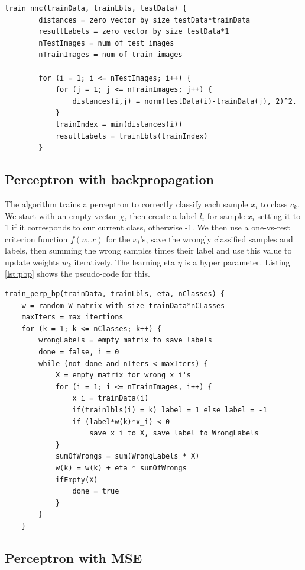 \documentclass[journal]{IEEEtran}
\begin{document}
\begin{minipage}[H]{0.95\linewidth}
	\begin{lstlisting}[caption=Implementation of NNC., label={lst:nnc}]
	train_nnc(trainData, trainLbls, testData) {
		distances = zero vector by size testData*trainData
		resultLabels = zero vector by size testData*1
		nTestImages = num of test images
		nTrainImages = num of train images
		
		for (i = 1; i <= nTestImages; i++) {
			for (j = 1; j <= nTrainImages; j++) {
				distances(i,j) = norm(testData(i)-trainData(j), 2)^2.
			}			
			trainIndex = min(distances(i))
			resultLabels = trainLbls(trainIndex)
		}
	\end{lstlisting}
\end{minipage}

\subsection{Perceptron with backpropagation} 

The algorithm trains a perceptron to correctly classify each sample $x_{i}$ to class $c_{k}$. We start with an empty vector $\chi$, then create a label $l_{i}$ for sample $x_{i}$ setting it to 1 if it corresponds to our current class, otherwise -1. We then use a one-vs-rest criterion function $f(w,x)$ for the $x_{i}$'s, save the wrongly classified samples and labels, then summing the wrong samples times their label and use this value to update weights $w_{k}$ iteratively. The learning eta $\eta$ is a hyper parameter. Listing \ref{lst:pbp} shows the pseudo-code for this.

\begin{lstlisting}[caption=Implementation of a perceptron with backprogapation., label={lst:pbp}]
	train_perp_bp(trainData, trainLbls, eta, nClasses) {
	w = random W matrix with size trainData*nCLasses
	maxIters = max itertions
	for (k = 1; k <= nClasses; k++) {
		wrongLabels = empty matrix to save labels
		done = false, i = 0
		while (not done and nIters < maxIters) {
			X = empty matrix for wrong x_i's
			for (i = 1; i <= nTrainImages, i++) {
				x_i = trainData(i)
				if(trainlbls(i) = k) label = 1 else label = -1
				if (label*w(k)*x_i) < 0
					save x_i to X, save label to WrongLabels
			}
			sumOfWrongs = sum(WrongLabels * X)
			w(k) = w(k) + eta * sumOfWrongs
			ifEmpty(X)
				done = true
			}
		}
	}
\end{lstlisting}

\subsection{Perceptron with MSE} 
\end{document}
